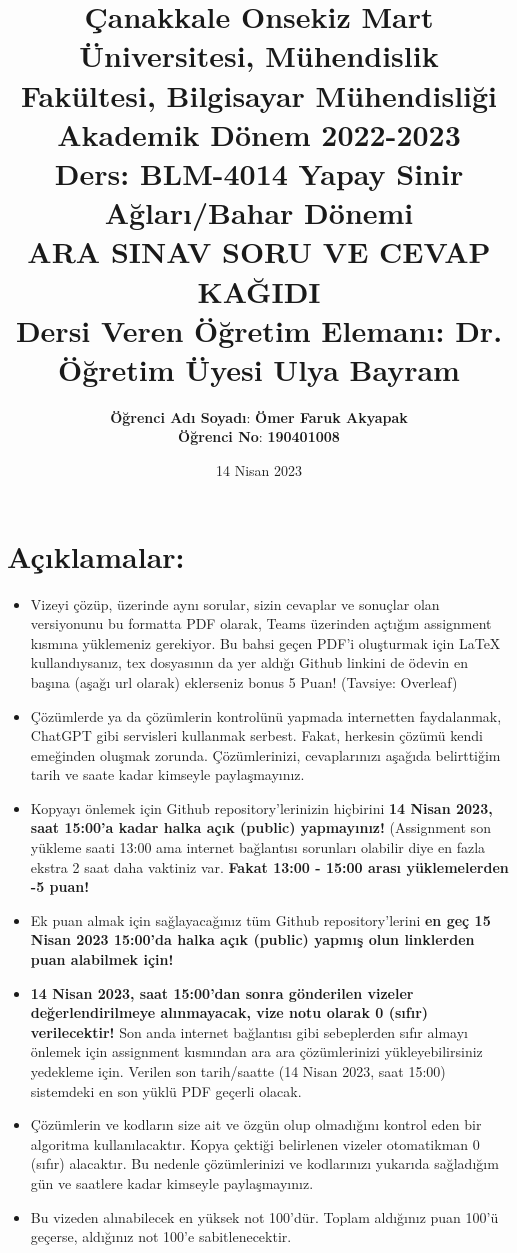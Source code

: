 \documentclass[11pt]{article}
\title{Çanakkale Onsekiz Mart Üniversitesi, Mühendislik Fakültesi, Bilgisayar Mühendisliği Akademik Dönem 2022-2023\\
Ders: BLM-4014 Yapay Sinir Ağları/Bahar Dönemi\\ 
ARA SINAV SORU VE CEVAP KAĞIDI\\
Dersi Veren Öğretim Elemanı: Dr. Öğretim Üyesi Ulya Bayram}
\author{%
\begin{minipage}{\textwidth}
\raggedright
\textbf{Öğrenci Adı Soyadı}: \textbf{Ömer Faruk Akyapak} \\
\textbf{Öğrenci No}: \textbf{190401008}
\end{minipage}%
}
\date{14 Nisan 2023}
\begin{document}
\maketitle

\vspace{-.5in}
\section*{Açıklamalar:}
\begin{itemize}
    \item Vizeyi çözüp, üzerinde aynı sorular, sizin cevaplar ve sonuçlar olan versiyonunu bu formatta PDF olarak, Teams üzerinden açtığım assignment kısmına yüklemeniz gerekiyor. Bu bahsi geçen PDF'i oluşturmak için LaTeX kullandıysanız, tex dosyasının da yer aldığı Github linkini de ödevin en başına (aşağı url olarak) eklerseniz bonus 5 Puan! (Tavsiye: Overleaf)
    \item Çözümlerde ya da çözümlerin kontrolünü yapmada internetten faydalanmak, ChatGPT gibi servisleri kullanmak serbest. Fakat, herkesin çözümü kendi emeğinden oluşmak zorunda. Çözümlerinizi, cevaplarınızı aşağıda belirttiğim tarih ve saate kadar kimseyle paylaşmayınız. 
    \item Kopyayı önlemek için Github repository'lerinizin hiçbirini \textbf{14 Nisan 2023, saat 15:00'a kadar halka açık (public) yapmayınız!} (Assignment son yükleme saati 13:00 ama internet bağlantısı sorunları olabilir diye en fazla ekstra 2 saat daha vaktiniz var. \textbf{Fakat 13:00 - 15:00 arası yüklemelerden -5 puan!}
    \item Ek puan almak için sağlayacağınız tüm Github repository'lerini \textbf{en geç 15 Nisan 2023 15:00'da halka açık (public) yapmış olun linklerden puan alabilmek için!}
    \item \textbf{14 Nisan 2023, saat 15:00'dan sonra gönderilen vizeler değerlendirilmeye alınmayacak, vize notu olarak 0 (sıfır) verilecektir!} Son anda internet bağlantısı gibi sebeplerden sıfır almayı önlemek için assignment kısmından ara ara çözümlerinizi yükleyebilirsiniz yedekleme için. Verilen son tarih/saatte (14 Nisan 2023, saat 15:00) sistemdeki en son yüklü PDF geçerli olacak.
    \item Çözümlerin ve kodların size ait ve özgün olup olmadığını kontrol eden bir algoritma kullanılacaktır. Kopya çektiği belirlenen vizeler otomatikman 0 (sıfır) alacaktır. Bu nedenle çözümlerinizi ve kodlarınızı yukarıda sağladığım gün ve saatlere kadar kimseyle paylaşmayınız.
    \item Bu vizeden alınabilecek en yüksek not 100'dür. Toplam aldığınız puan 100'ü geçerse, aldığınız not 100'e sabitlenecektir.

\end{itemize}
\end{document}
